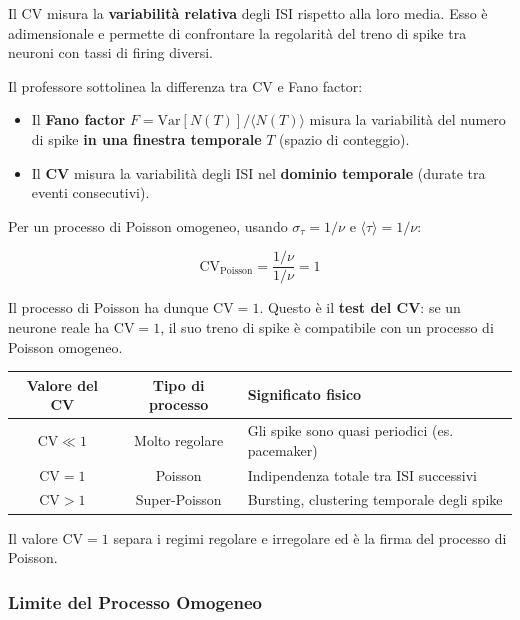 Il CV misura la \textbf{variabilità relativa} degli ISI rispetto alla loro media. Esso è adimensionale e permette di confrontare la regolarità del treno di spike tra neuroni con tassi di firing diversi.

Il professore sottolinea la differenza tra CV e Fano factor:
\begin{itemize}
    \item Il \textbf{Fano factor} $F = \text{Var}[N(T)] / \langle N(T) \rangle$ misura la variabilità del numero di spike \textbf{in una finestra temporale} $T$ (spazio di conteggio).
    \item Il \textbf{CV} misura la variabilità degli ISI nel \textbf{dominio temporale} (durate tra eventi consecutivi).
\end{itemize}

Per un processo di Poisson omogeneo, usando $\sigma_\tau = 1/\nu$ e $\langle \tau \rangle = 1/\nu$:

\begin{equation}
\text{CV}_{\text{Poisson}} = \frac{1/\nu}{1/\nu} = 1
\end{equation}

Il processo di Poisson ha dunque $\text{CV} = 1$. Questo è il \textbf{test del CV}: se un neurone reale ha $\text{CV} = 1$, il suo treno di spike è compatibile con un processo di Poisson omogeneo.


\begin{table}[htbp]
    \centering
    \renewcommand{\arraystretch}{1.3}
    \begin{tabularx}{\textwidth}{|c|c|X|}
    \hline
    \textbf{Valore del CV} & \textbf{Tipo di processo} & \textbf{Significato fisico} \\
    \hline
    $\text{CV} \ll 1$ & Molto regolare & Gli spike sono quasi periodici (es. pacemaker) \\
    \hline
    $\text{CV} = 1$ & Poisson & Indipendenza totale tra ISI successivi \\
    \hline
    $\text{CV} > 1$ & Super-Poisson & Bursting, clustering temporale degli spike \\
    \hline
    \end{tabularx}
\end{table}


Il valore $\text{CV} = 1$ separa i regimi regolare e irregolare ed è la firma del processo di Poisson.


\subsubsection{Limite del Processo Omogeneo}

